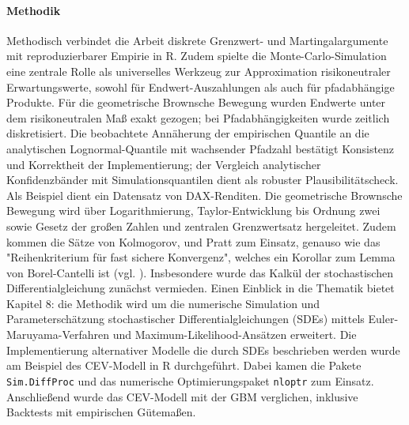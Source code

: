 \paragraph{Methodik}
Methodisch verbindet die Arbeit diskrete Grenzwert- und Martingalargumente mit 
reproduzierbarer Empirie in R. Zudem spielte die Monte-Carlo-Simulation eine zentrale Rolle als universelles Werkzeug zur Approximation risikoneutraler Erwartungswerte, sowohl für Endwert-Auszahlungen als auch für pfadabhängige Produkte. Für die geometrische Brownsche Bewegung wurden Endwerte unter dem risikoneutralen Maß exakt gezogen; bei Pfadabhängigkeiten wurde zeitlich diskretisiert. Die beobachtete Annäherung der empirischen Quantile an die analytischen Lognormal-Quantile mit wachsender Pfadzahl bestätigt Konsistenz und Korrektheit der Implementierung; der Vergleich analytischer Konfidenzbänder mit Simulationsquantilen dient als robuster Plausibilitätscheck.
Als Beispiel dient ein Datensatz von DAX-Renditen.
Die geometrische Brownsche Bewegung wird über Logarithmierung, Taylor-Entwicklung bis Ordnung zwei sowie Gesetz der großen Zahlen und 
zentralen Grenzwertsatz hergeleitet. Zudem kommen die Sätze von Kolmogorov, und Pratt zum Einsatz, 
genauso wie das "Reihenkriterium für fast sichere Konvergenz", welches 
ein Korollar zum Lemma von Borel-Cantelli ist (vgl. \cite{henze}). Insbesondere wurde
das Kalkül der stochastischen Differentialgleichung zunächst vermieden. Einen Einblick
in die Thematik bietet Kapitel 8: die Methodik wird um die numerische Simulation und Parameterschätzung stochastischer Differentialgleichungen (SDEs) mittels Euler-Maruyama-Verfahren und Maximum-Likelihood-Ansätzen erweitert. 
Die Implementierung alternativer Modelle die durch SDEs beschrieben werden wurde am Beispiel des CEV-Modell in R durchgeführt.
Dabei kamen die Pakete \texttt{Sim.DiffProc} und das numerische Optimierungspaket \texttt{nloptr} zum Einsatz.
Anschließend wurde das CEV-Modell mit der GBM verglichen, inklusive Backtests mit empirischen Gütemaßen.
